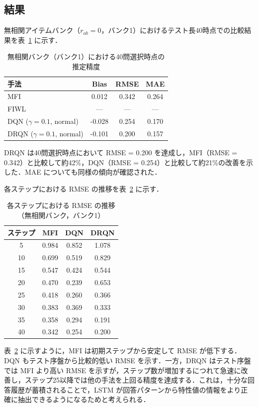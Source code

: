 \documentclass[dvipdfmx,a4j]{jarticle}
\begin{document}
\subsection{結果}

無相関アイテムバンク（$r_{ab}=0$，バンク1）におけるテスト長40時点での比較結果を表~\ref{tab:step40_results} に示す．

\begin{table}[t]
\centering
\caption{無相関バンク（バンク1）における40問選択時点の推定精度}
\label{tab:step40_results}
\small
\begin{tabular}{lccc}
\toprule
手法 & Bias & RMSE & MAE \\
\midrule
MFI & 0.012 & 0.342 & 0.264 \\
FIWL & --- & --- & --- \\
DQN ($\gamma=0.1$, normal) & -0.028 & 0.254 & 0.170 \\
DRQN ($\gamma=0.1$, normal) & -0.101 & 0.200 & 0.157 \\
\bottomrule
\end{tabular}
\end{table}

DRQN は40問選択時点において RMSE = 0.200 を達成し，MFI（RMSE = 0.342）と比較して約42\%，DQN（RMSE = 0.254）と比較して約21\%の改善を示した．MAE についても同様の傾向が確認された．

各ステップにおける RMSE の推移を表~\ref{tab:rmse_by_step} に示す．

\begin{table}[t]
\centering
\caption{各ステップにおける RMSE の推移（無相関バンク，バンク1）}
\label{tab:rmse_by_step}
\small
\begin{tabular}{cccc}
\toprule
ステップ & MFI & DQN & DRQN \\
\midrule
5  & 0.984 & 0.852 & 1.078 \\
10 & 0.699 & 0.519 & 0.829 \\
15 & 0.547 & 0.424 & 0.544 \\
20 & 0.470 & 0.239 & 0.653 \\
25 & 0.418 & 0.260 & 0.366 \\
30 & 0.383 & 0.369 & 0.333 \\
35 & 0.358 & 0.294 & 0.191 \\
40 & 0.342 & 0.254 & 0.200 \\
\bottomrule
\end{tabular}
\end{table}

表~\ref{tab:rmse_by_step} に示すように，MFI は初期ステップから安定して RMSE が低下する．DQN もテスト序盤から比較的低い RMSE を示す．一方，DRQN はテスト序盤では MFI より高い RMSE を示すが，ステップ数が増加するにつれて急速に改善し，ステップ25以降では他の手法を上回る精度を達成する．これは，十分な回答履歴が蓄積されることで，LSTM が回答パターンから特性値の情報をより正確に抽出できるようになるためと考えられる．
\end{document}
